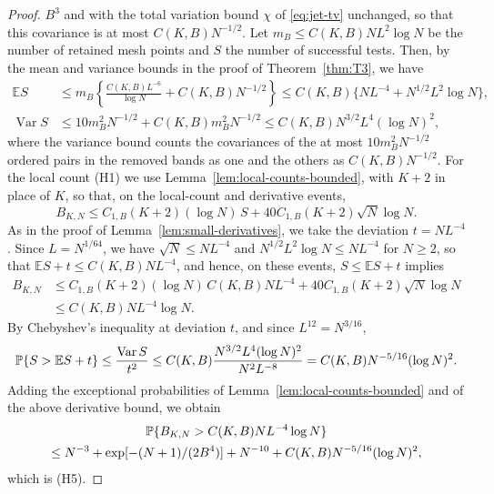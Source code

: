 \begin{proof}
$B^3$ and with the total variation bound $\chi$ of \eqref{eq:jet-tv}
unchanged, so that this covariance is at most $C(K,B)N^{-1/2}$.
Let $m_B\le C(K,B)NL^2\log N$ be the number of retained mesh points and
$S$ the number of successful tests.
Then, by the mean and variance bounds in the proof of
Theorem~\ref{thm:T3}, we have
\begin{align*}
 \mathbb ES
 &\le m_B\left\{\frac{C(K,B)L^{-6}}{\log N}+C(K,B)N^{-1/2}\right\}
 \le C(K,B)\{NL^{-4}+N^{1/2}L^2\log N\},\\
 \operatorname{Var}S
 &\le10m_B^2N^{-1/2}+C(K,B)m_B^2N^{-1/2}
 \le C(K,B)N^{3/2}L^4(\log N)^2,
\end{align*}
where the variance bound counts the covariances of the at most
$10m_B^2N^{-1/2}$ ordered pairs in the removed bands as one and
the others as $C(K,B)N^{-1/2}$.
For the local count (H1) we use Lemma~\ref{lem:local-counts-bounded},
with $K+2$ in place of $K$, so that, on the local-count and derivative
events,
\[
 B_{K,N}\le C_{1,B}(K+2)(\log N)\,S+40C_{1,B}(K+2)\sqrt N\log N.
\]
As in the proof of Lemma~\ref{lem:small-derivatives}, we take the
deviation $t=NL^{-4}$. Since $L=N^{1/64}$, we have $\sqrt N\le NL^{-4}$
and $N^{1/2}L^2\log N\le NL^{-4}$ for $N\ge2$, so that
$\mathbb ES+t\le C(K,B)NL^{-4}$, and hence, on these events,
$S\le\mathbb ES+t$ implies
\begin{align*}
 B_{K,N}&\le C_{1,B}(K+2)(\log N)\,C(K,B)NL^{-4}
 +40C_{1,B}(K+2)\sqrt N\log N\\
 &\le C(K,B)NL^{-4}\log N.
\end{align*}
By Chebyshev's inequality at deviation $t$, and since $L^{12}=N^{3/16}$,
\[
 \mathbb P\{S>\mathbb ES+t\}
 \le\frac{\operatorname{Var}S}{t^2}
 \le C(K,B)\frac{N^{3/2}L^4(\log N)^2}{N^2L^{-8}}
 =C(K,B)N^{-5/16}(\log N)^2.
\]
Adding the exceptional probabilities of
Lemma~\ref{lem:local-counts-bounded} and of the above derivative bound,
we obtain
\begin{multline}
 \mathbb P\{B_{K,N}>C(K,B)NL^{-4}\log N\}\\
 \le N^{-3}+\exp[-(N+1)/(2B^4)]+N^{-10}+C(K,B)N^{-5/16}(\log N)^2,
 \label{eq:bounded-small-derivatives}
\end{multline}
which is (H5).


\end{proof}
